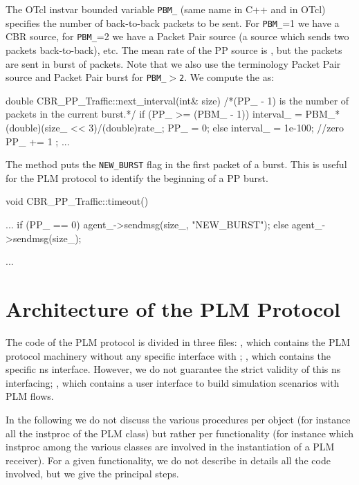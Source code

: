 {The OTcl instvar bounded variable {\tt PBM\_} (same name in C++ and in OTcl)
specifies the number of back-to-back packets to be sent. For {\tt PBM\_}=1 we
have a CBR source, for {\tt PBM\_}=2 we have a Packet Pair source (a source which
sends two packets back-to-back), etc. The mean rate of the PP source is
, but the packets are sent in burst of  packets. Note
that we also use the terminology Packet Pair source and Packet Pair burst for
{\tt PBM\_$>$2}.
We compute the  as:
\begin{program}
double CBR_PP_Traffic::next_interval(int& size)
{
{\cf /*(PP_ - 1) is the  number of packets in the current burst.*/}
        if (PP_ >= (PBM_ - 1)){         
                interval_ = PBM_*(double)(size_ << 3)/(double)rate_;
                PP_ = 0;
        }
        else {
                interval_ = 1e-100; //zero
                PP_ += 1 ;
        }
...
}
\end{program}

The  method puts the {\tt NEW\_BURST} flag in the first packet of a
burst. This is useful for the PLM protocol to identify the beginning of a PP
burst.

\begin{program}
  void CBR_PP_Traffic::timeout()
  {
    ...
    if (PP_ == 0) 
      agent_->sendmsg(size_, "NEW_BURST");
    else 
      agent_->sendmsg(size_);
    
    ...
    }
\end{program}

\section{Architecture of the PLM Protocol}
The code of the PLM protocol is divided in three files: ,
which contains the PLM protocol machinery without any specific interface with
\ns; , which contains the specific ns interface.
However, we do not guarantee the strict validity of this ns interfacing;
, which contains a user interface to build simulation
scenarios with PLM flows. 

In the following we do not discuss the various procedures per object (for
instance all the instproc of the PLM class)  but rather per functionality (for
instance which instproc among the various classes are involved in the instantiation
of a PLM receiver). For a given functionality, we do not describe in details all
the code involved, but we give the principal steps.



}
